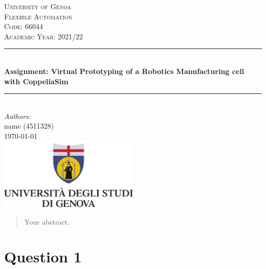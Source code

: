 \documentclass[a4paper]{article}
\begin{document}
\begin{titlepage}

\newcommand{\HRule}{\rule{\linewidth}{0.5mm}} 							%
\center 
 
\textsc{\LARGE University of Genoa}\\[1cm]

\textsc{\Large Flexible Automation}\\[0.2cm]
\textsc{\large Code: 66044}\\[1cm] 										%
\textsc{\large Academic Year: 2021/22}\\[1cm] 										%
\HRule \\[0.8cm]
{ \huge \bfseries Assignment: Virtual Prototyping of a Robotics Manufacturing cell with CoppeliaSim}\\[0.7cm]								%
\HRule \\[2cm]
\large
\emph{Authors:}\\
name (4511328)\\[1.5cm]													%
{\large \today}\\[5cm]
\includegraphics[width=0.5\textwidth]{images/UnigeLogo.png}\\[1cm] 	%
\vfill 
\end{titlepage}

\begin{abstract}
Your abstract.
\end{abstract}

\section*{Question 1}



\end{document}
